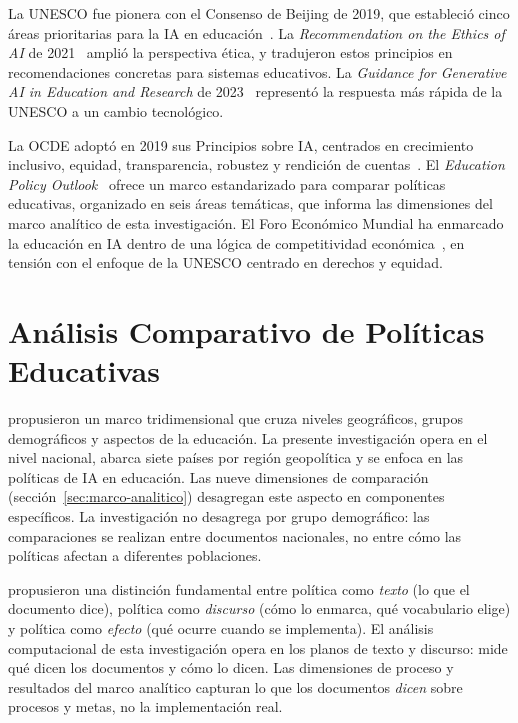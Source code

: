La UNESCO fue pionera con el Consenso de Beijing de 2019, que estableció cinco áreas prioritarias para la IA en educación~\citep{unesco2019beijing}. La \textit{Recommendation on the Ethics of AI} de 2021~\citep{unesco2021ai} amplió la perspectiva ética, y \citet{miao2021guidance} tradujeron estos principios en recomendaciones concretas para sistemas educativos. La \textit{Guidance for Generative AI in Education and Research} de 2023~\citep{unesco2023genai} representó la respuesta más rápida de la UNESCO a un cambio tecnológico.

La OCDE adoptó en 2019 sus Principios sobre IA, centrados en crecimiento inclusivo, equidad, transparencia, robustez y rendición de cuentas~\citep{oecd2019ai}. El \textit{Education Policy Outlook}~\citep{oecd2021epo} ofrece un marco estandarizado para comparar políticas educativas, organizado en seis áreas temáticas, que informa las dimensiones del marco analítico de esta investigación. El Foro Económico Mundial ha enmarcado la educación en IA dentro de una lógica de competitividad económica~\citep{wef2020future}, en tensión con el enfoque de la UNESCO centrado en derechos y equidad.


\section{Análisis Comparativo de Políticas Educativas}
\label{sec:analisis-comparativo}

\citet{bray1995levels} propusieron un marco tridimensional que cruza niveles geográficos, grupos demográficos y aspectos de la educación. La presente investigación opera en el nivel nacional, abarca siete países por región geopolítica y se enfoca en las políticas de IA en educación. Las nueve dimensiones de comparación (sección~\ref{sec:marco-analitico}) desagregan este aspecto en componentes específicos. La investigación no desagrega por grupo demográfico: las comparaciones se realizan entre documentos nacionales, no entre cómo las políticas afectan a diferentes poblaciones.

\citet{rizvi2010globalizing} propusieron una distinción fundamental entre política como \textit{texto} (lo que el documento dice), política como \textit{discurso} (cómo lo enmarca, qué vocabulario elige) y política como \textit{efecto} (qué ocurre cuando se implementa). El análisis computacional de esta investigación opera en los planos de texto y discurso: mide qué dicen los documentos y cómo lo dicen. Las dimensiones de proceso y resultados del marco analítico capturan lo que los documentos \emph{dicen} sobre procesos y metas, no la implementación real.

